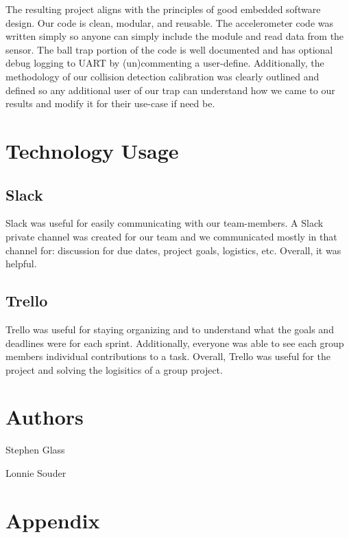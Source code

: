The resulting project aligns with the principles of good embedded software design. Our code is clean, modular, and reusable. The accelerometer code was written simply so anyone can simply include the module and read data from the sensor. The ball trap portion of the code is well documented and has optional debug logging to U\+A\+RT by (un)commenting a user-\/define. Additionally, the methodology of our collision detection calibration was clearly outlined and defined so any additional user of our trap can understand how we came to our results and modify it for their use-\/case if need be.\hypertarget{index_technology_usage}{}\section{Technology Usage}\label{index_technology_usage}
\hypertarget{index_Slack}{}\subsection{Slack}\label{index_Slack}
Slack was useful for easily communicating with our team-\/members. A Slack private channel was created for our team and we communicated mostly in that channel for\+: discussion for due dates, project goals, logistics, etc. Overall, it was helpful.\hypertarget{index_Trello}{}\subsection{Trello}\label{index_Trello}
Trello was useful for staying organizing and to understand what the goals and deadlines were for each sprint. Additionally, everyone was able to see each group members\textquotesingle{} individual contributions to a task. Overall, Trello was useful for the project and solving the logisitics of a group project.\hypertarget{index_authors}{}\section{Authors}\label{index_authors}

\begin{DoxyItemize}
\item Stephen Glass
\item Lonnie Souder
\end{DoxyItemize}\hypertarget{index_Appendix}{}\section{Appendix}\label{index_Appendix}
 